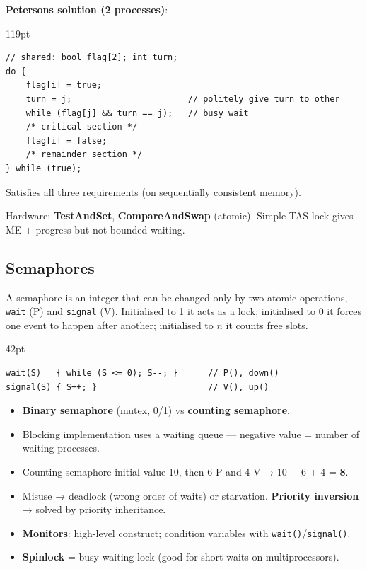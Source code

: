 \textbf{Peterson\textquotesingle s solution (2 processes)}:

\begin{listingblock}{119pt}
\begin{Verbatim}[fontsize=\fontsize{9.0}{10.9}\selectfont]
// shared: bool flag[2]; int turn;
do {
    flag[i] = true;
    turn = j;                       // politely give turn to other
    while (flag[j] && turn == j);   // busy wait
    /* critical section */
    flag[i] = false;
    /* remainder section */
} while (true);
\end{Verbatim}
\end{listingblock}

Satisfies all three requirements (on sequentially consistent memory).

Hardware: \textbf{TestAndSet}, \textbf{CompareAndSwap} (atomic). Simple TAS lock gives ME + progress but not bounded waiting.

\needspace{122pt}

\hypertarget{p2-05--34-semaphores}{%
\subsection{Semaphores}\label{p2-05--34-semaphores}}

A semaphore is an integer that can be changed only by two atomic operations, \texttt{wait} (P) and \texttt{signal} (V).
Initialised to 1 it acts as a lock; initialised to 0 it forces one event to happen after another;
initialised to \(n\) it counts free slots.

\begin{listingblock}{42pt}
\begin{Verbatim}[fontsize=\fontsize{9.0}{10.9}\selectfont]
wait(S)   { while (S <= 0); S--; }      // P(), down()
signal(S) { S++; }                      // V(), up()
\end{Verbatim}
\end{listingblock}

\begin{itemize}
\tightlist
\item
  \textbf{Binary semaphore} (mutex, 0/1) vs \textbf{counting semaphore}.
\item
  Blocking implementation uses a waiting queue --- negative value = number of waiting processes.
\item
  Counting semaphore initial value 10, then 6 P and 4 V → 10 − 6 + 4 = \textbf{8}.
\item
  Misuse → deadlock (wrong order of waits) or starvation. \textbf{Priority inversion} → solved by priority inheritance.
\item
  \textbf{Monitors}: high-level construct; condition variables with \texttt{wait()}/\texttt{signal()}.
\item
  \textbf{Spinlock} = busy-waiting lock (good for short waits on multiprocessors).
\end{itemize}

